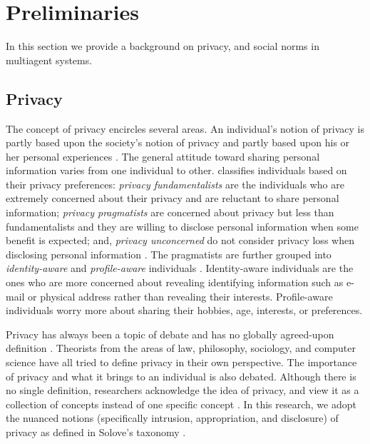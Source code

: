\section{Preliminaries}

In this section we provide a background on privacy, and social norms in
multiagent systems.

\subsection{Privacy}
The concept of privacy encircles several areas. An individual's notion of
privacy is partly based upon the society's notion of privacy and partly
based upon his or her personal experiences \citep{westin1967privacy,
westin2003social}. The general attitude toward sharing personal
information varies from one individual to other.
\citet{westin1967privacy} classifies individuals based on their privacy
preferences: \textit{privacy fundamentalists} are the individuals who
are extremely concerned about their privacy and are reluctant to share
personal information; \textit{privacy pragmatists} are concerned about
privacy but less than fundamentalists and they are willing to disclose
personal information when some benefit is expected; and,
\textit{privacy unconcerned} do not consider privacy loss when
disclosing personal information \citep{westin1967privacy}. The
pragmatists are further grouped into \emph{identity-aware} and \emph{profile-aware}
individuals \citep{spiekermann2009enggprivacy}. Identity-aware
individuals are the ones who are more concerned about revealing
identifying information such as e-mail or physical address rather than
revealing their interests. Profile-aware individuals worry more about
sharing their hobbies, age, interests, or preferences.

Privacy has always been a topic of debate and has no globally
agreed-upon definition \citep{smith2007privacy}. Theorists from the
areas of law, philosophy, sociology, and computer science have all tried
to define privacy in their own perspective.
%
%
The importance of privacy and what it brings to an individual is also
debated. Although there is no single definition, researchers 
acknowledge the idea of privacy, and view it as a
collection of concepts instead of one specific concept
\citep{smith2007privacy}. In this research, we adopt the nuanced notions
(specifically intrusion, appropriation, and disclosure) of privacy as
defined in Solove's taxonomy \citep{solove-2006-taxonomy}.

